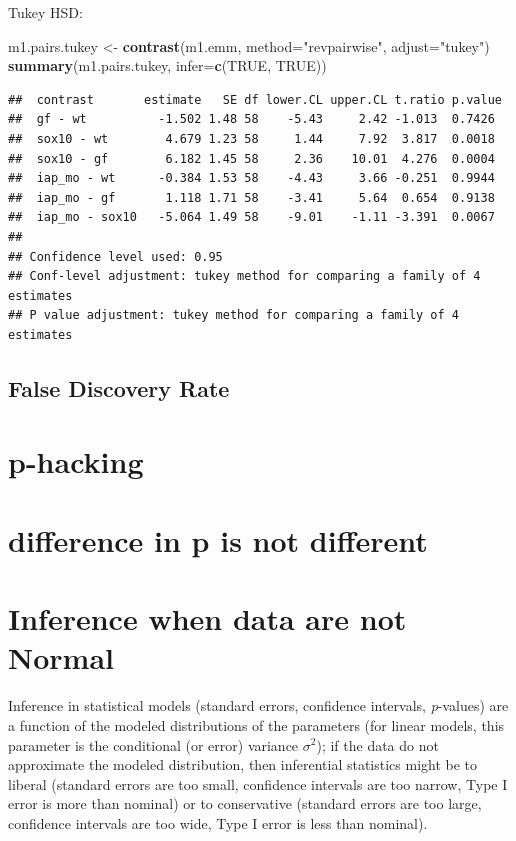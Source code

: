 \documentclass[]{book}
\newenvironment{Shaded}{\begin{snugshade}}{\end{snugshade}}
\newcommand{\KeywordTok}[1]{\textcolor[rgb]{0.13,0.29,0.53}{\textbf{#1}}}
\newcommand{\DataTypeTok}[1]{\textcolor[rgb]{0.13,0.29,0.53}{#1}}
\newcommand{\StringTok}[1]{\textcolor[rgb]{0.31,0.60,0.02}{#1}}
\newcommand{\OtherTok}[1]{\textcolor[rgb]{0.56,0.35,0.01}{#1}}
\newcommand{\NormalTok}[1]{#1}
\begin{document}
Tukey HSD:

\begin{Shaded}
\begin{Highlighting}[]
\NormalTok{m1.pairs.tukey <-}\StringTok{ }\KeywordTok{contrast}\NormalTok{(m1.emm, }\DataTypeTok{method=}\StringTok{"revpairwise"}\NormalTok{, }\DataTypeTok{adjust=}\StringTok{"tukey"}\NormalTok{)}
\KeywordTok{summary}\NormalTok{(m1.pairs.tukey, }\DataTypeTok{infer=}\KeywordTok{c}\NormalTok{(}\OtherTok{TRUE}\NormalTok{, }\OtherTok{TRUE}\NormalTok{))}
\end{Highlighting}
\end{Shaded}

\begin{verbatim}
##  contrast       estimate   SE df lower.CL upper.CL t.ratio p.value
##  gf - wt          -1.502 1.48 58    -5.43     2.42 -1.013  0.7426 
##  sox10 - wt        4.679 1.23 58     1.44     7.92  3.817  0.0018 
##  sox10 - gf        6.182 1.45 58     2.36    10.01  4.276  0.0004 
##  iap_mo - wt      -0.384 1.53 58    -4.43     3.66 -0.251  0.9944 
##  iap_mo - gf       1.118 1.71 58    -3.41     5.64  0.654  0.9138 
##  iap_mo - sox10   -5.064 1.49 58    -9.01    -1.11 -3.391  0.0067 
## 
## Confidence level used: 0.95 
## Conf-level adjustment: tukey method for comparing a family of 4 estimates 
## P value adjustment: tukey method for comparing a family of 4 estimates
\end{verbatim}

\subsection{False Discovery Rate}\label{false-discovery-rate-1}

\section{p-hacking}\label{p-hacking}

\section{difference in p is not
different}\label{difference-in-p-is-not-different}

\section{Inference when data are not
Normal}\label{inference-when-data-are-not-normal}

Inference in statistical models (standard errors, confidence intervals,
\emph{p}-values) are a function of the modeled distributions of the
parameters (for linear models, this parameter is the conditional (or
error) variance \(\sigma^2\)); if the data do not approximate the
modeled distribution, then inferential statistics might be to liberal
(standard errors are too small, confidence intervals are too narrow,
Type I error is more than nominal) or to conservative (standard errors
are too large, confidence intervals are too wide, Type I error is less
than nominal).
\end{document}
